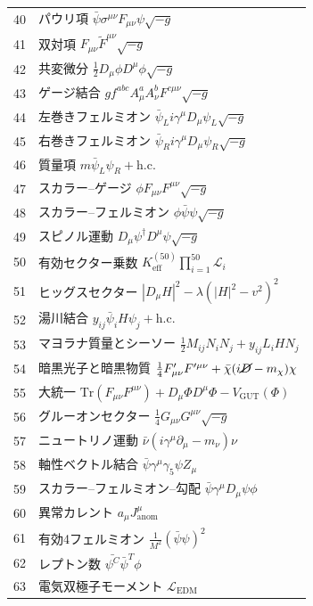 \documentclass[13pt,a4paper]{ltjsarticle}
\begin{document}
\begin{longtable}{r l}
		40 & パウリ項 \(\bar{\psi}\sigma^{\mu\nu}F_{\mu\nu}\psi\sqrt{-g}\) \\
		41 & 双対項 \(F_{\mu\nu}\tilde{F}^{\mu\nu}\sqrt{-g}\) \\
		42 & 共変微分 \(\frac{1}{2}D_\mu\phi D^\mu\phi\sqrt{-g}\) \\
		43 & ゲージ結合 \(g f^{abc}A^a_\mu A^b_\nu F^{c\mu\nu}\sqrt{-g}\) \\
		44 & 左巻きフェルミオン \(\bar{\psi}_L i\gamma^\mu D_\mu\psi_L\sqrt{-g}\) \\
		45 & 右巻きフェルミオン \(\bar{\psi}_R i\gamma^\mu D_\mu\psi_R\sqrt{-g}\) \\
		46 & 質量項 \(m\bar{\psi}_L\psi_R + \text{h.c.}\) \\
		47 & スカラー–ゲージ \(\phi F_{\mu\nu}F^{\mu\nu}\sqrt{-g}\) \\
		48 & スカラー–フェルミオン \(\phi\bar{\psi}\psi\sqrt{-g}\) \\
		49 & スピノル運動 \(D_\mu\psi^\dagger D^\mu\psi\sqrt{-g}\) \\
		50 & 有効セクター乗数 \(K^{(50)}_{\mathrm{eff}}\prod_{i=1}^{50}\mathcal{L}_i\) \\
		51 & ヒッグスセクター \(|D_\mu H|^2 - \lambda(|H|^2 - v^2)^2\) \\
		52 & 湯川結合 \(y_{ij}\bar{\psi}_i H\psi_j + \text{h.c.}\) \\
		53 & マヨラナ質量とシーソー \(\frac{1}{2}M_{ij}N_i N_j + y_{ij}L_i H N_j\) \\
		54 & 暗黒光子と暗黒物質 \(\frac{1}{4}F'_{\mu\nu}F'^{\mu\nu} + \bar{\chi}(i\cancel{D} - m_\chi)\chi\) \\
		55 & 大統一 \(\mathrm{Tr}(F_{\mu\nu}F^{\mu\nu}) + D_\mu\Phi D^\mu\Phi - V_{\text{GUT}}(\Phi)\) \\
		56 & グルーオンセクター \(\frac{1}{4}G_{\mu\nu}G^{\mu\nu}\sqrt{-g}\) \\
		57 & ニュートリノ運動 \(\bar{\nu}(i\gamma^\mu\partial_\mu - m_\nu)\nu\) \\
		58 & 軸性ベクトル結合 \(\bar{\psi}\gamma^\mu\gamma_5\psi Z_\mu\) \\
		59 & スカラー–フェルミオン–勾配 \(\bar{\psi}\gamma^\mu D_\mu\psi\phi\) \\
		60 & 異常カレント \(a_\mu J^\mu_{\text{anom}}\) \\
		61 & 有効4フェルミオン \(\frac{1}{M^2}(\bar{\psi}\psi)^2\) \\
		62 & レプトン数 \(\bar{\psi^C}\bar{\psi}^T\phi\) \\
		63 & 電気双極子モーメント \(\mathcal{L}_{\text{EDM}}\) \\

\end{longtable}
\end{document}
